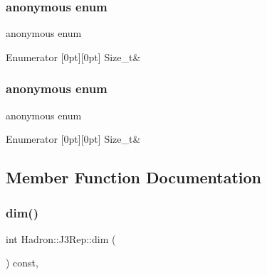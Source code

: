 \subsubsection{\texorpdfstring{anonymous enum}{anonymous enum}}
{\footnotesize\ttfamily anonymous enum}

\begin{DoxyEnumFields}{Enumerator}
[0pt][0pt]{}\mbox{\label{structHadron_1_1J3Rep_a01001f359a9ba212165295d45ac3a79cabc2ea108a2c20f2a53588a413ad5d4f7}} 
Size\+\_\+t&\\
\hline

\end{DoxyEnumFields}
\mbox{\label{structHadron_1_1J3Rep_a01001f359a9ba212165295d45ac3a79c}} 
\subsubsection{\texorpdfstring{anonymous enum}{anonymous enum}}
{\footnotesize\ttfamily anonymous enum}

\begin{DoxyEnumFields}{Enumerator}
[0pt][0pt]{}\mbox{\label{structHadron_1_1J3Rep_a01001f359a9ba212165295d45ac3a79cabc2ea108a2c20f2a53588a413ad5d4f7}} 
Size\+\_\+t&\\
\hline

\end{DoxyEnumFields}


\subsection{Member Function Documentation}
\mbox{\label{structHadron_1_1J3Rep_ab2c01ddb7d42f7ce131a9e07f0a6703d}} 
\subsubsection{\texorpdfstring{dim()}{dim()}\hspace{0.1cm}{\footnotesize\ttfamily [1/3]}}
{\footnotesize\ttfamily int Hadron\+::\+J3\+Rep\+::dim (\begin{DoxyParamCaption}{ }\end{DoxyParamCaption}) const\hspace{0.3cm}{\ttfamily [inline]}, {\ttfamily [virtual]}}



